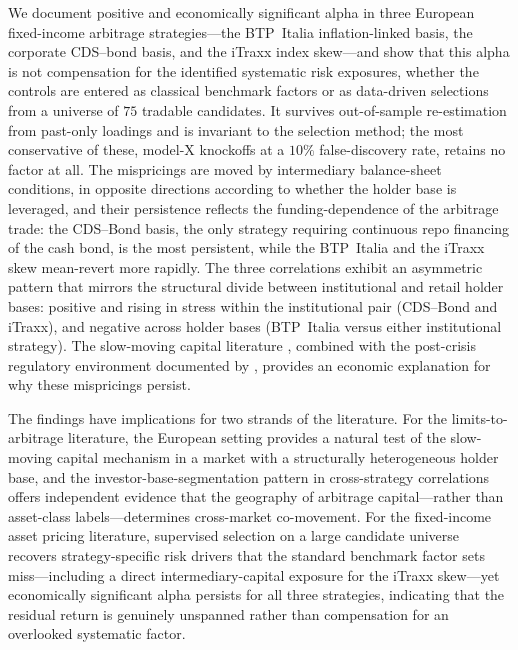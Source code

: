 We document positive and economically significant alpha in three
European fixed-income arbitrage strategies---the BTP~Italia
inflation-linked basis, the corporate CDS--bond basis, and the
iTraxx index skew---and show that this alpha is not compensation for
the identified systematic risk exposures, whether the controls are
entered as classical benchmark factors or as data-driven selections
from a universe of $75$ tradable candidates. It survives out-of-sample re-estimation from past-only loadings and is
invariant to the selection method; the most conservative of these,
model-X knockoffs at a $10\%$ false-discovery rate, retains no factor
at all. The mispricings are
moved by intermediary balance-sheet conditions, in opposite directions
according to whether the holder base is leveraged, and their
persistence reflects the
funding-dependence of the arbitrage trade: the CDS--Bond basis,
the only strategy requiring continuous repo financing of the cash
bond, is the most persistent, while the BTP~Italia and the iTraxx
skew mean-revert more rapidly. The three correlations exhibit an
asymmetric pattern that mirrors the structural divide between
institutional and retail holder bases: positive and rising in stress
within the institutional pair (CDS--Bond and iTraxx), and negative
across holder bases (BTP~Italia versus either institutional
strategy). The slow-moving capital literature
\citep{duffie2010presidential, brunnermeier2009market,
mitchell2012arbitrage}, combined with the post-crisis regulatory
environment documented by \citet{boyarchenko2016trends}, provides
an economic explanation for why these mispricings persist.

The findings have implications for two strands of the literature.
For the limits-to-arbitrage literature, the European setting
provides a natural test of the slow-moving capital mechanism in a
market with a structurally heterogeneous holder base, and the
investor-base-segmentation pattern in cross-strategy correlations
offers independent evidence that the geography of arbitrage
capital---rather than asset-class labels---determines cross-market
co-movement. For the fixed-income asset pricing literature,
supervised selection on a large candidate universe recovers
strategy-specific risk drivers that the standard benchmark factor
sets miss---including a direct intermediary-capital exposure for the
iTraxx skew---yet economically significant alpha persists for all
three strategies, indicating that the residual return is genuinely
unspanned rather than compensation for an overlooked systematic
factor.